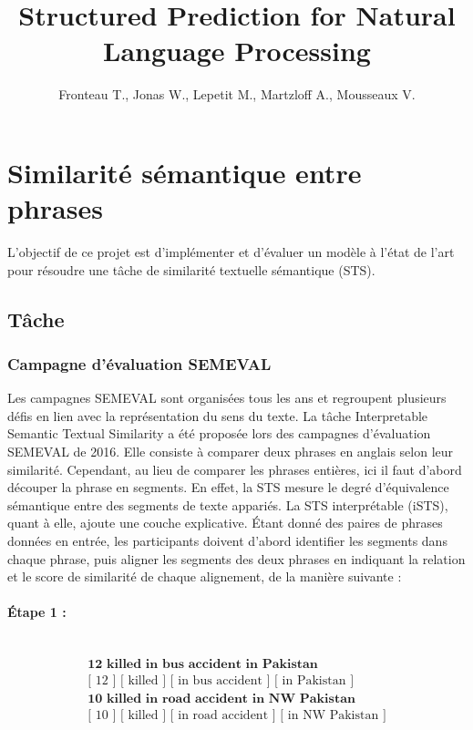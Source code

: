 \documentclass[a4paper, twoside, 11pt]{article}
\title{Structured Prediction for Natural Language Processing}
\author{Fronteau T., Jonas W., Lepetit M., Martzloff A., Mousseaux V.}
\begin{document}
 \maketitle
 \section{Similarité sémantique entre phrases}
    L'objectif de ce projet est d'implémenter et d'évaluer un modèle à l’état de l’art pour résoudre une tâche de similarité textuelle sémantique (STS).

    \subsection{Tâche}

        \subsubsection{Campagne d’évaluation SEMEVAL}

    Les campagnes SEMEVAL sont organisées tous les ans et regroupent plusieurs défis en lien avec la représentation du sens du texte. La tâche Interpretable Semantic Textual Similarity a été proposée lors des campagnes d’évaluation SEMEVAL de 2016. Elle consiste à comparer deux phrases en anglais selon leur similarité. Cependant, au lieu de comparer les phrases entières, ici il faut d’abord découper la phrase en segments. En effet, la STS mesure le degré d'équivalence sémantique entre des segments de texte appariés. La STS interprétable (iSTS), quant à elle, ajoute une couche explicative. Étant donné des paires de phrases données en entrée, les participants doivent d'abord identifier les segments dans chaque phrase, puis aligner les segments des deux phrases en indiquant la relation et le score de similarité de chaque alignement, de la manière suivante : \hfill \linebreak
 \paragraph{Étape 1 :}\mbox{}\\
 \begin{eqnarray*}
\textbf{12 killed in bus accident in Pakistan}\\
\textrm{[ 12 ] [ killed ] [ in bus accident ] [ in Pakistan ]}\\
\textbf{10 killed in road accident in NW Pakistan}\\
\textrm{[ 10 ] [ killed ] [ in road accident ] [ in NW Pakistan ]}\\
\end{eqnarray*}
\end{document}
